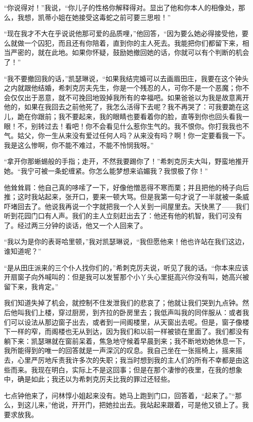 \par “你说得对！”我说，“你儿子的性格你解释得对。显出了他和你本人的相像处，那么，我想，凯蒂小姐在她接受这毒蛇之前可要三思啦！”
\par “现在我才不大在乎说说他那可爱的品质哩，”他回答，“因为要么她必得接受他，要么就做一个囚犯，而且还有你陪着，直到你的主人死去。我能把你们都留下来，相当严密的，就在此地。如果你怀疑，鼓励她撤回她的话，你就可以有个判断的机会了！”
\par “我不要撤回我的话，”凯瑟琳说，“如果我结完婚可以去画眉田庄，我要在这个钟头之内就跟他结婚，希刺克厉夫先生，你是一个残忍的人，可你不是一个恶魔；你不会仅仅出于恶意，就不可挽回地毁掉我所有的幸福吧。如果爸爸以为我是故意离开他的，如果在我回去之前他死了，我怎么活得下去呢？我不再哭了：可我要跪在这儿，跪在你跟前；我不要起来，我的眼睛也要看着你的脸，直等到你也回头看我一眼！不，别转过去！看吧！你不会看见什么惹你生气的。我不恨你。你打我我也不气。姑父，你一生从来没有爱过任何人吗？从来没有吗？啊！你一定要看我一下。我是这么惨啊，你不能不难过，不能不怜悯我呀。”
\par “拿开你那蜥蜴般的手指；走开，不然我要踢你了！”希刺克厉夫大叫，野蛮地推开她。“我宁可被一条蛇缠紧。你怎么能梦想来谄媚我？我恨极了你！”
\par 他耸耸肩：他自己真的哆嗦了一下，好像他憎恶得不寒而栗；并且把他的椅子向后推；这时我站起来，张开口，要来一顿大骂。但是我第一句才说了一半就被一条威吓堵回去了。他说我再说一个字就把我一个人关到一间屋里去。天快黑了——我们听到花园门口有人声。我们的主人立刻赶出去了：他还有他的机智，我们可没有了。经过两三分钟的谈话，他又一个人回来了。
\par “我以为是你的表哥哈里顿，”我对凯瑟琳说，“我但愿他来！他也许站在我们这边，谁知道呢？”
\par “是从田庄派来的三个仆人找你们的，”希刺克厉夫说，听见了我的话。“你本来应该开扇窗子向外喊叫的：但是我可以发誓那个小丫头心里挺高兴你没有叫，她高兴被留下来，我肯定。”
\par 我们知道失掉了机会，就控制不住发泄我们的悲哀了；他就让我们哭到九点钟。然后他叫我们上楼，穿过厨房，到齐拉的卧房里去；我低声叫我的同伴服从：或者我们可以设法从那边窗子出去，或者到一间阁楼里，从天窗出去呢。但是，窗子像楼下一样的窄，而阁楼也无从到达，因为我们和以前一样被锁在里面了。我们都没有躺下来：凯瑟琳就在窗前呆着，焦急地守候着早晨到来；我不断地劝她休息一下，我所能得到的唯一的回答就是一声深沉的叹息。我自己坐在一张摇椅上，摇来摇去，心里严厉地斥责我许多次的失职；我当时想到我的主人们的所有不幸都是由这些而来。我现在明白，实际上不是这回事；但是在那个凄惨的夜里，在我的想象中，确是如此；我还以为希刺克厉夫比我的罪过还轻些。
\par 七点钟他来了，问林惇小姐起来没有。她马上跑到门口，回答着，“起来了。”“那么，到这儿来，”他说，开开门，把她拉出去。我站起来跟着，可是他又锁上了。我要求放我。
